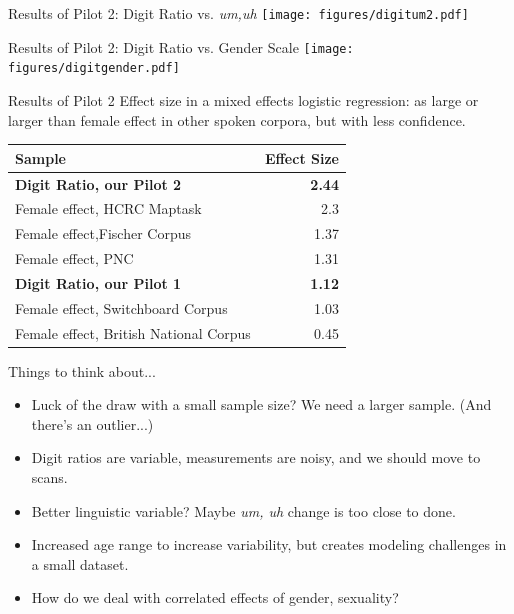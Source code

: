 \documentclass[hyperref={pdfpagelabels=false}]{beamer}
\begin{document}
\begin{frame}{Results of Pilot 2: Digit Ratio vs. \textsl{um,uh}}
\texttt{[image: figures/digitum2.pdf]}
\end{frame}

\begin{frame}{Results of Pilot 2: Digit Ratio vs. Gender Scale}
\texttt{[image: figures/digitgender.pdf]}
\end{frame}


\begin{frame}{Results of Pilot 2}
\noindent Effect size in a mixed effects logistic regression: as large or larger than female effect in other spoken corpora, but with less confidence.\begin{center}
\begin{tabular}{l r}
\toprule
\textbf{Sample} & \textbf{Effect Size}\\
\midrule
\textbf{Digit Ratio, our Pilot 2} & \textbf{2.44}\\
Female effect, HCRC Maptask & 2.3\\
Female effect,Fischer Corpus & 1.37\\
Female effect, PNC & 1.31\\
\textbf{Digit Ratio, our Pilot 1} & \textbf{1.12}\\
Female effect, Switchboard Corpus & 1.03\\
Female effect, British National Corpus & 0.45\\
\bottomrule
\end{tabular}
\end{center}

\end{frame}


\begin{frame}{Things to think about...}
\begin{itemize}
	\item Luck of the draw with a small sample size? We need a larger sample. (And there's an outlier...)
	\item Digit ratios are variable, measurements are noisy, and we should move to scans.
	\item Better linguistic variable? Maybe \textsl{um, uh} change is too close to done.
	\item Increased age range to increase variability, but creates modeling challenges in a small dataset.
	\item How do we deal with correlated effects of gender, sexuality?
\end{itemize}
\end{frame}
\end{document}
